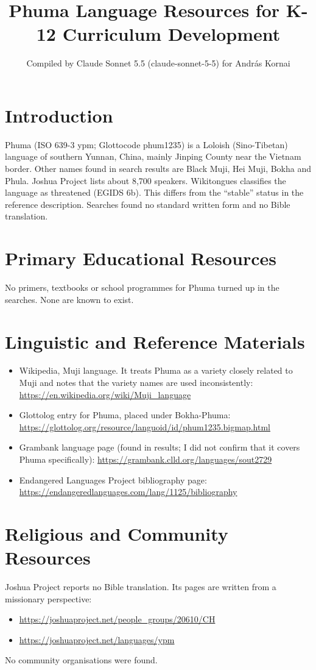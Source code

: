\documentclass[12pt]{article}
\title{Phuma Language Resources for K-12 Curriculum Development}
\author{Compiled by Claude Sonnet 5.5 (claude-sonnet-5-5) for Andr\'as Kornai}
\date{}
\begin{document}
\maketitle

\section{Introduction}
Phuma (ISO 639-3 ypm; Glottocode phum1235) is a Loloish (Sino-Tibetan) language of southern Yunnan, China, mainly Jinping County near the Vietnam border. Other names found in search results are Black Muji, Hei Muji, Bokha and Phula. Joshua Project lists about 8,700 speakers. Wikitongues classifies the language as threatened (EGIDS 6b). This differs from the ``stable'' status in the reference description. Searches found no standard written form and no Bible translation.

\section{Primary Educational Resources}
No primers, textbooks or school programmes for Phuma turned up in the searches. None are known to exist.

\section{Linguistic and Reference Materials}
\begin{itemize}
\item Wikipedia, Muji language. It treats Phuma as a variety closely related to Muji and notes that the variety names are used inconsistently: \url{https://en.wikipedia.org/wiki/Muji_language}
\item Glottolog entry for Phuma, placed under Bokha-Phuma: \url{https://glottolog.org/resource/languoid/id/phum1235.bigmap.html}
\item Grambank language page (found in results; I did not confirm that it covers Phuma specifically): \url{https://grambank.clld.org/languages/sout2729}
\item Endangered Languages Project bibliography page: \url{https://endangeredlanguages.com/lang/1125/bibliography}
\end{itemize}

\section{Religious and Community Resources}
Joshua Project reports no Bible translation. Its pages are written from a missionary perspective:
\begin{itemize}
\item \url{https://joshuaproject.net/people_groups/20610/CH}
\item \url{https://joshuaproject.net/languages/ypm}
\end{itemize}
No community organisations were found.
\end{document}
